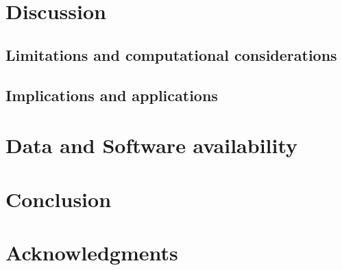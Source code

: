 \documentclass[final,3p,times]{elsarticle}
\begin{document}
\section{Discussion}
\label{sec:discussion}

\subsection{Limitations and computational considerations}
\label{subsec:limitations}

\subsection{Implications and applications}
\label{subsec:implications}

\section{Data and Software availability}
\label{sec:availability}

\section{Conclusion}
\label{sec:conclusion}

\section*{Acknowledgments}




\end{document}
